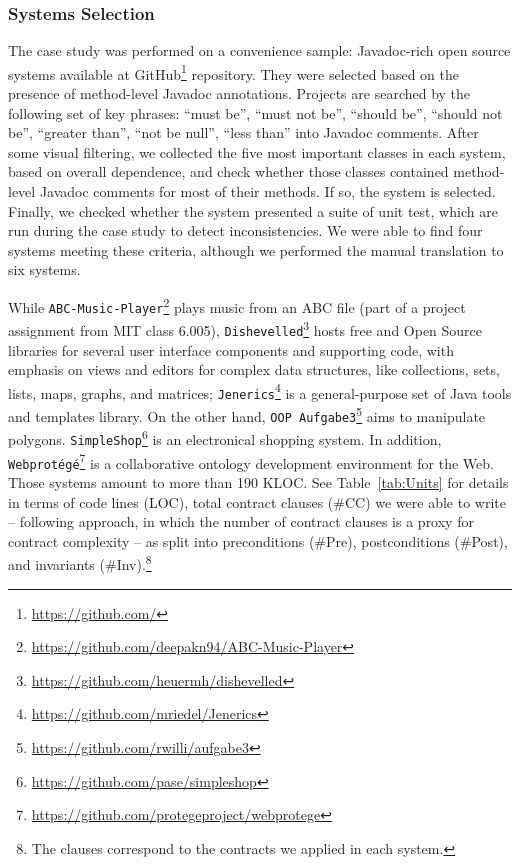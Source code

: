 \subsubsection{Systems Selection} 
\label{sec:systems}

The case study was performed on a convenience sample: \totalSystems{}
Javadoc-rich open source systems available at GitHub\footnote{\url{https://github.com/}} repository.
They were selected based on the presence of method-level Javadoc annotations. 
Projects are searched by the following set of key phrases: ``must be'', ``must not be'', ``should
be'', ``should not be'', ``greater than'', ``not be null'', ``less than'' into Javadoc
comments.
After some visual filtering, we collected the five most important classes in
each system, based on overall dependence, and check whether those classes
contained method-level Javadoc comments for most of their methods. If so, the
system is selected. Finally, we checked whether the system presented a suite of
unit test, which are run during the case study to detect inconsistencies. We
were able to find four systems meeting these criteria, although we performed the
manual translation to six systems.

While \texttt{ABC-Music-Player}\footnote{\url{https://github.com/deepakn94/ABC-Music-Player}}
plays music from an ABC file (part of a project assignment from MIT class
6.005), \texttt{Dishevelled}\footnote{\url{https://github.com/heuermh/dishevelled}} hosts
free and Open Source libraries for several user interface components and
supporting code, with emphasis on views and editors for complex data structures, like collections, sets, lists, maps, graphs, and
matrices; \texttt{Jenerics}\footnote{\url{https://github.com/mriedel/Jenerics}} is a general-purpose set of Java tools and templates library.
On the other hand, \texttt{OOP
Aufgabe3}\footnote{\url{https://github.com/rwilli/aufgabe3}} aims to manipulate
polygons. \texttt{SimpleShop}\footnote{\url{https://github.com/pase/simpleshop}} is an
electronical shopping system. In addition,
\texttt{Webprot\'{e}g\'{e}}\footnote{\url{https://github.com/protegeproject/webprotege}}
is a collaborative ontology development environment for the Web. Those systems amount to more than 190 KLOC. See Table~\ref{tab:Units} for details in
terms of code lines (LOC), total contract clauses (\#CC) we were able to write
-- following \cite{Estler-etal14} approach, in which the number of contract clauses is a proxy for contract complexity -- as split
into preconditions (\#Pre), postconditions (\#Post), and invariants (\#Inv).\footnote{The clauses
correspond to the contracts we applied in each system.}

